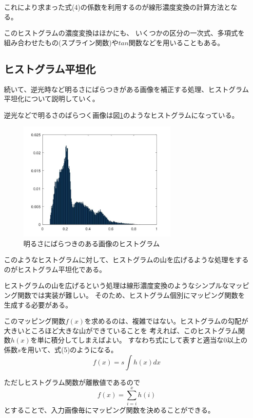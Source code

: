 \documentclass[a4paper,11pt,dvipdfmx]{jsarticle}
\begin{document}
これにより求まった式(4)の係数を利用するのが線形濃度変換の計算方法となる。

このヒストグラムの濃度変換はほかにも、
いくつかの区分の一次式、多項式を組み合わせたもの(スプライン関数)や$tan$関数などを用いることもある。

\subsection{ヒストグラム平坦化}
続いて、逆光時など明るさにばらつきがある画像を補正する処理、ヒストグラム平坦化について説明していく。

逆光などで明るさのばらつく画像は図\ref{hist_2}のようなヒストグラムになっている。
\begin{figure}[htbp]
    \centering
    \includegraphics[width=80mm]{./img/flatten_ex.jpg}
    \caption{明るさにばらつきのある画像のヒストグラム}
    \label{hist_2}
\end{figure}

このようなヒストグラムに対して、ヒストグラムの山を広げるような処理をするのがヒストグラム平坦化である。

ヒストグラムの山を広げるという処理は線形濃度変換のようなシンプルなマッピング関数では実装が難しい。
そのため、ヒストグラム個別にマッピング関数を生成する必要がある。

このマッピング関数$f(x)$を求めるのは、複雑ではない。ヒストグラムの勾配が大きいところほど大きな山ができていることを
考えれば、このヒストグラム関数$h(x)$を単に積分してしまえばよい。
すなわち式にして表すと適当な0以上の係数$s$を用いて、式(5)のようになる。
\begin{equation}
    f(x) = s \int h(x)dx
\end{equation}

ただしヒストグラム関数が離散値であるので
\begin{equation}
    f(x) = \sum_{i=i}^{x}h(i)
\end{equation}
とすることで、入力画像毎にマッピング関数を決めることができる。
\end{document}
